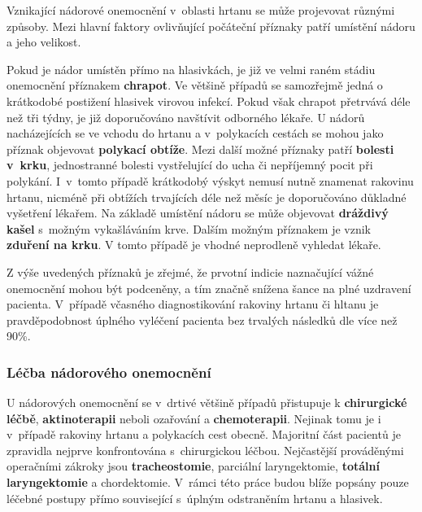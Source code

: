 Vznikající nádorové onemocnění v~oblasti hrtanu se může projevovat různými
způsoby. Mezi hlavní faktory ovlivňující počáteční příznaky patří umístění nádoru a
jeho velikost.

Pokud je nádor umístěn přímo na hlasivkách, je již ve velmi raném stádiu onemocnění příznakem \textbf{chrapot}.
Ve většině případů se samozřejmě jedná o krátkodobé postižení hlasivek virovou infekcí. Pokud však chrapot přetrvává déle než tři týdny, je již doporučováno navštívit odborného lékaře.
U nádorů nacházejících se ve vchodu do hrtanu a v~polykacích cestách se mohou
jako příznak objevovat \textbf{polykací obtíže}. Mezi další možné příznaky
patří \textbf{bolesti v~krku}, jednostranné bolesti vystřelující do ucha či
nepříjemný pocit při polykání. I~v~tomto případě krátkodobý výskyt nemusí
nutně znamenat rakovinu hrtanu, nicméně při obtížích trvajících déle než měsíc
je doporučováno důkladné  vyšetření lékařem.
Na základě umístění nádoru se může objevovat \textbf{dráždivý kašel} s~možným
vykašláváním krve. Dalším možným příznakem je vznik \textbf{zduření na krku}.
V tomto případě je vhodné neprodleně vyhledat lékaře.

Z výše uvedených příznaků je zřejmé, že prvotní indicie naznačující vážné onemocnění
mohou být podceněny, a tím značně snížena šance na plné uzdravení pacienta.
V~případě včasného diagnostikování rakoviny hrtanu či hltanu je pravděpodobnost
úplného vyléčení pacienta bez trvalých následků dle \cite{Slavicek2000} více než 90\%.



\subsubsection{Léčba nádorového onemocnění} %
\label{chap:cause:desease:cancer:treatment}

U nádorových onemocnění se v~drtivé většině případů přistupuje k
\textbf{chirurgické léčbě}, \textbf{aktinoterapii} neboli ozařování a
\textbf{chemoterapii}. Nejinak tomu je i v~případě rakoviny hrtanu a
polykacích cest obecně. Majoritní část pacientů je zpravidla nejprve
konfrontována s~chirurgickou léčbou. Nejčastější prováděnými operačními zákroky jsou
\textbf{tracheostomie}, parciální laryngektomie, \textbf{totální
laryngektomie} a chordektomie. V~rámci této práce budou blíže popsány pouze
léčebné postupy přímo související s~úplným odstraněním hrtanu a hlasivek.

